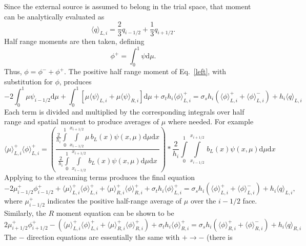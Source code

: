 \documentclass{mc2013}
\renewcommand{\d}{\mathrm{d}}
\newcommand{\mom}[1]{\langle #1 \rangle}
\newcommand{\xl}{{x_{i-1/2}}}
\newcommand{\xr}{{x_{i+1/2}}}
\newcommand{\il}{{i-1/2}}
\begin{document}
 Since the external
source is assumed to belong in the trial space, that moment can be analytically
evaluated as
\begin{equation}\label{left_mom}
\mom{q}_{L,i} = \frac{2}{3} q_{i-1/2} + \frac{1}{3} q_{i+1/2}.
\end{equation}
Half range moments are then taken, defining
\begin{equation}
\phi^+ = \int_0^1 \psi \d \mu.
\end{equation}
Thus, $\phi = \phi^- + \phi ^+$.
The positive half range moment of Eq.~\eqref{left}, with substitution for $\phi$, produces
\begin{equation}
-2 \int_0^1\mu \psi_{i-1/2} \d \mu + \int_0^1\left[\mu \mom{\psi}_{L,i} +  \mu \mom\psi_{R,i} \right] \d \mu + \sigma_t h_i \mom{\phi}_{L,i}^+ = \sigma_s h_i \left( \mom{\phi}_{L,i}^+ + \mom\phi_{L,i}^-\right) + h_i \mom{q}_{L,i}
\end{equation}
Each term is divided and multiplied by the corresponding integrals over half range
and spatial moment to produce averages of $\mu$ where needed. For example
\begin{equation}\displaystyle 
\mom{{\mu}}_{L,i}^+ \mom{\phi}_{L,i}^+ = \left( \frac{\displaystyle 
\frac{2}{h_i} \int\limits_0^1 \int\limits_\xl^\xr \mu \, b_L(x) \psi(x,\mu) \d \mu \d x } 
{\displaystyle \frac{2}{h_i} \int\limits_0^1 \int\limits_\xl^\xr \, b_L(x) \psi(x,\mu) \d \mu \d x } \right)
* \displaystyle \frac{2}{h_i} \int\limits_0^1 \int\limits_\xl^\xr \, b_L(x) \psi(x,\mu) \d \mu \d x 
\end{equation}
Applying to the streaming terms produces the final equation
\begin{equation}
-2{\mu}_{i-1/2}^+ \phi_{i-1/2}^+ + \mom {\mu}_{L,i}^+ \mom{\phi}_{L,i}^+ +  \mom\mu_{R,i}^+
\mom{\phi}_{R,i}^+ + \sigma_t h_i \mom{\phi}_{L,i}^+ =  \sigma_s h_i \left( \mom{\phi}_{L,i}^+ +
\mom\phi_{L,i}^-\right) + h_i \mom{q}_{L,i},
\end{equation}
where $\mu_{i-1/2}^+$ indicates the positive half-range average of $\mu$ over the
$\il$ face.
Similarly, the $R$ moment equation can be shown to be
\begin{equation}
2{\mu}_{i+1/2}^+ \phi_{i+1/2}^+ - \left( \mom\mu_{L,i}^+ \mom{\phi}_{L,i}^+ +  \mom\mu_{R,i}^+ \mom{\phi}_{R,i}^+ \right) + \sigma_t h_i \mom{\phi}_{R,i}^+ =  \sigma_s h_i \left( \mom{\phi}_{R,i}^+ + \mom\phi_{R,i}^-\right) + h_i \mom{q}_{R,i}
\end{equation}
The $-$ direction equations are essentially the same with $+ \rightarrow -$ (there is
\end{document}
